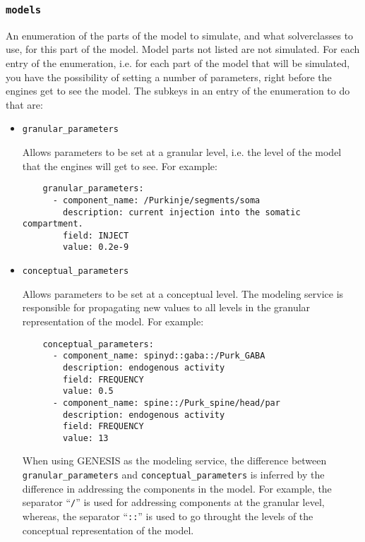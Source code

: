 \documentclass[12pt]{article}
\begin{document}
\subsubsection*{\tt models}

    An enumeration of the parts of the model to simulate, and what solverclasses to use, for this part of the model. Model parts not listed are not simulated. For each entry of the enumeration, i.e. for each part of the model that will be simulated, you have the possibility of setting a number of parameters, right before the engines get to see the model. The subkeys in an entry of the enumeration to do that are: 

\begin{itemize}

\item[ ] {\tt granular\_parameters}

Allows parameters to be set at a granular level, i.e. the level of the model that the engines will get to see. For example: 

\begin{verbatim}
    granular_parameters:
      - component_name: /Purkinje/segments/soma
        description: current injection into the somatic compartment.
        field: INJECT
        value: 0.2e-9
\end{verbatim}

\item[ ]{\tt conceptual\_parameters}

Allows parameters to be set at a conceptual level. The modeling service is responsible for propagating new values to all levels in the granular representation of the model. For example:

\begin{verbatim}
    conceptual_parameters:
      - component_name: spinyd::gaba::/Purk_GABA
        description: endogenous activity
        field: FREQUENCY
        value: 0.5
      - component_name: spine::/Purk_spine/head/par
        description: endogenous activity
        field: FREQUENCY
        value: 13
\end{verbatim}
When using GENESIS as the modeling service, the difference between {\tt granular\_parameters} and {\tt conceptual\_parameters} is inferred by the difference in addressing the components in the model. For example, the separator ``{\tt /}'' is used for addressing components at the granular level, whereas, the separator ``{\tt ::}'' is used to go throught the levels of the conceptual representation of the model.

\end{itemize}
\end{document}
